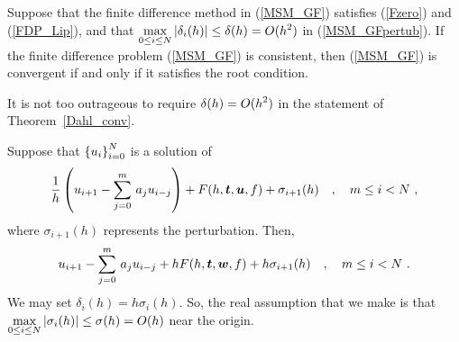 \begin{theorem}[Dahlquist]
Suppose that the finite difference method in (\ref{MSM_GF}) satisfies
(\ref{Fzero}) and (\ref{FDP_Lip}), and that
$\displaystyle \max_{0 \leq i \leq N} | \delta_i(h) | \leq
\delta(h) = O(h^2)$ in (\ref{MSM_GFpertub}).
If the finite difference problem (\ref{MSM_GF}) is consistent, then
(\ref{MSM_GF}) is convergent if and only if it satisfies the root
condition.  \label{Dahl_conv}
\end{theorem}

\begin{rmk}
It is not too outrageous to require
$\displaystyle \delta(h) = O(h^2)$ in the statement of Theorem~\ref{Dahl_conv}.

Suppose that $\displaystyle \left\{u_i\right\}_{i=0}^N$ is a
solution of
\[
\frac{1}{h} \left( u_{i+1} - \sum_{j=0}^m\,a_ju_{i-j}\right)
+ F(h,\bm{t},\bm{u},f) + \sigma_{i+1}(h) \quad , \quad m\leq i < N \ ,
\]
where $\sigma_{i+1}(h)$ represents the perturbation.  Then,
\[
u_{i+1} - \sum_{j=0}^m\,a_ju_{i-j} + h  F(h,\bm{t},\bm{w},f)
+ h\sigma_{i+1}(h) \quad , \quad m\leq i < N \ .
\]
We may set $\delta_i(h) = h \sigma_i(h)$.  So, the real assumption that we
make is that $\displaystyle \max_{0 \leq i \leq N} | \sigma_i(h) | \leq
\sigma(h) = O(h)$ near the origin.
\end{rmk}

